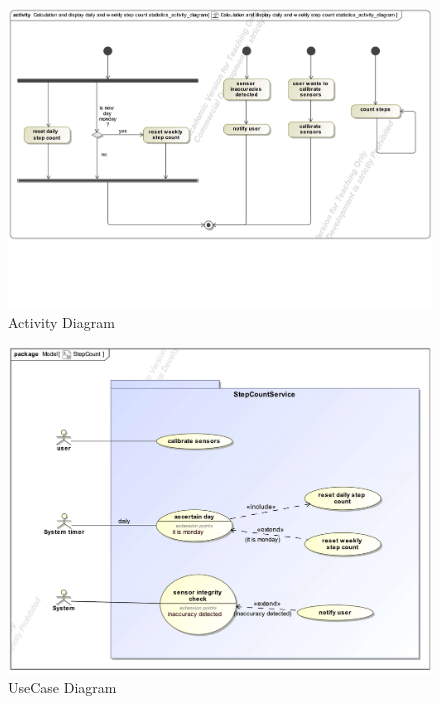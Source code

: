 \documentclass{article}
\begin{document}
		\begin{figure}[h!]
			\centering
		    	\captionsetup{labelformat=empty}
		    	\caption{Activity Diagram}
		    	\includegraphics[width=\textwidth, angle=0]{Marc/step/StepCountActivity.pdf}
		\end{figure}
		\clearpage
		\begin{figure}[h!]
			\centering
			\captionsetup{labelformat=empty}
			\caption{UseCase Diagram}
		    	\includegraphics[width=\textwidth, angle=0]{Marc/step/StepCountUseCase.pdf}
		\end{figure}
		\clearpage
\end{document}
